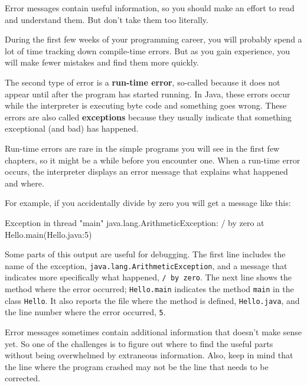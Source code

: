\documentclass[12pt]{book}
\theoremstyle{exercise}
\newcommand{\java}[1]{\verb"#1"}
\begin{document}
Error messages contain useful information, so you should make an effort to read and understand them.
But don't take them too literally.

During the first few weeks of your programming career, you will probably spend a lot of time tracking down compile-time errors.
But as you gain experience, you will make fewer mistakes and find them more quickly.



The second type of error is a {\bf run-time error}, so-called because it does not appear until after the program has started running.
In Java, these errors occur while the interpreter is executing byte code and something goes wrong.
These errors are also called {\bf exceptions} because they usually indicate that something exceptional (and bad) has happened.

Run-time errors are rare in the simple programs you will see in the first few chapters, so it might be a while before you encounter one.
When a run-time error occurs, the interpreter displays an error message that explains what happened and where.

For example, if you accidentally divide by zero you will get a message like this:

\begin{small}
\begin{stdout}
Exception in thread "main" java.lang.ArithmeticException: / by zero
    at Hello.main(Hello.java:5)
\end{stdout}
\end{small}


Some parts of this output are useful for debugging.
The first line includes the name of the exception, \java{java.lang.ArithmeticException}, and a message that indicates more specifically what happened, \java{/ by zero}.
The next line shows the method where the error occurred; \java{Hello.main} indicates the method \java{main} in the class \java{Hello}.
It also reports the file where the method is defined, \java{Hello.java}, and the line number where the error occurred, \java{5}.

Error messages sometimes contain additional information that doesn't make sense yet.
So one of the challenges is to figure out where to find the useful parts without being overwhelmed by extraneous information.
Also, keep in mind that the line where the program crashed may not be the line that needs to be corrected.
\end{document}
